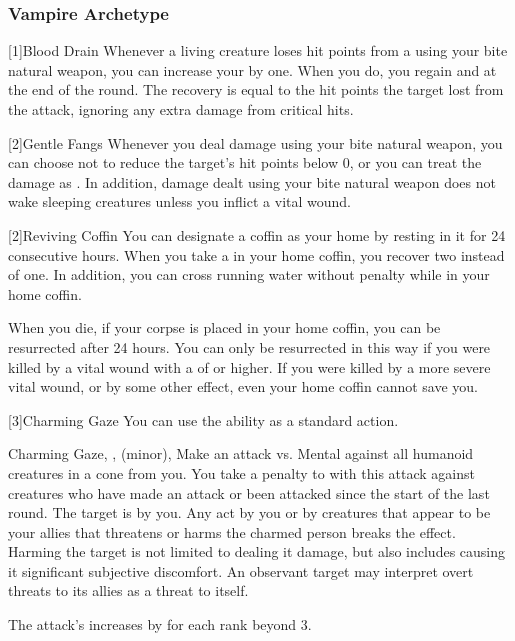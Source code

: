         \subsubsection{Vampire Archetype}

            [1]{Blood Drain} Whenever a living creature loses hit points from a  using your bite natural weapon, you can increase your  by one.
            When you do, you regain  and  at the end of the round.
            The recovery is equal to the hit points the target lost from the attack, ignoring any extra damage from critical hits.

            [2]{Gentle Fangs} Whenever you deal damage using your bite natural weapon, you can choose not to reduce the target's hit points below 0, or you can treat the damage as .
            In addition, damage dealt using your bite natural weapon does not wake sleeping creatures unless you inflict a vital wound.

            [2]{Reviving Coffin} You can designate a coffin as your home by resting in it for 24 consecutive hours.
            When you take a  in your home coffin, you recover two  instead of one.
            In addition, you can cross running water without penalty while in your home coffin.

            When you die, if your corpse is placed in your home coffin, you can be resurrected after 24 hours.
            You can only be resurrected in this way if you were killed by a vital wound with a  of  or higher.
            If you were killed by a more severe vital wound, or by some other effect, even your home coffin cannot save you.

            [3]{Charming Gaze} You can use the  ability as a standard action.
            \begin{magicalsustainability}{Charming Gaze}{, ,  (minor), }
                \rankline
                Make an attack vs. Mental against all humanoid creatures in a \largearea cone from you.
                You take a  penalty to  with this attack against creatures who have made an attack or been attacked since the start of the last round.
                \hit The target is \charmed by you.
                Any act by you or by creatures that appear to be your allies that threatens or harms the charmed person breaks the effect.
                Harming the target is not limited to dealing it damage, but also includes causing it significant subjective discomfort.
                An observant target may interpret overt threats to its allies as a threat to itself.

                \rankline

                \noindent The attack's  increases by  for each rank beyond 3.
            \end{magicalsustainability}

